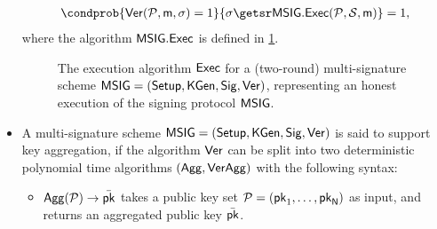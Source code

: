 \begin{definition}
\begin{itemize}
        \begin{align*}
            \condprob{\Ver(\PkSet, \msg, \sigma) = 1}{\sigma \getsr \MSig.\Exec(\PkSet, \SkSet, \msg)} = 1,
        \end{align*}
        where the algorithm $\mathsf{MSIG}.\mathsf{Exec}$ is defined in \cref{fig:def-complet-multi-sig}.
        \begin{figure}[h!]%
	   \centering%
	   \nicoresetlinenr
	   \caption{The execution algorithm $\mathsf{Exec}$ for a (two-round) multi-signature scheme $\mathsf{MSIG} = (\mathsf{Setup}, \mathsf{KGen}, \mathsf{Sig}, {\mathsf{Ver}})$, representing an honest execution of the signing protocol $\mathsf{MSIG}$.}
	   \label{fig:def-complet-multi-sig}
        \end{figure}
        \item {} A multi-signature scheme $\mathsf{MSIG} = (\mathsf{Setup}, \mathsf{KGen}, \mathsf{Sig}, {\mathsf{Ver}})$ is said to support key aggregation, if the algorithm ${\mathsf{Ver}}$ can be split into two deterministic polynomial time algorithms $(\mathsf{Agg}, \mathsf{VerAgg})$ with the following syntax:
        \begin{itemize}
            \item $\mathsf{Agg}(\mathcal{P}) \rightarrow \bar{{\mathsf{pk}}}$ takes a public key set $\mathcal{P} = ({\mathsf{pk}}_1, \ldots, {\mathsf{pk}}_{\mathsf{N}})$ as input, and returns an aggregated public key $\bar{{\mathsf{pk}}}$.

\end{itemize}
\end{itemize}
\end{definition}

